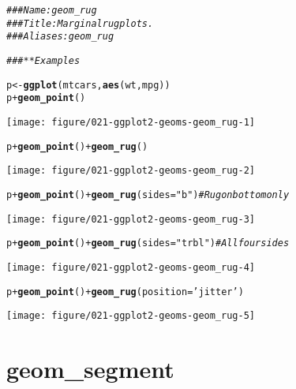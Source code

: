 \documentclass[a4paper,titlepage]{tufte-handout}\usepackage[]{graphicx}\usepackage[]{color}
\makeatletter
\def\maxwidth{ %
  \ifdim\Gin@nat@width>\linewidth
    \linewidth
  \else
    \Gin@nat@width
  \fi
}
\newcommand{\hlstr}[1]{\textcolor[rgb]{0.192,0.494,0.8}{#1}}%
\newcommand{\hlcom}[1]{\textcolor[rgb]{0.678,0.584,0.686}{\textit{#1}}}%
\newcommand{\hlopt}[1]{\textcolor[rgb]{0,0,0}{#1}}%
\newcommand{\hlstd}[1]{\textcolor[rgb]{0.345,0.345,0.345}{#1}}%
\newcommand{\hlkwb}[1]{\textcolor[rgb]{0.69,0.353,0.396}{#1}}%
\newcommand{\hlkwc}[1]{\textcolor[rgb]{0.333,0.667,0.333}{#1}}%
\newcommand{\hlkwd}[1]{\textcolor[rgb]{0.737,0.353,0.396}{\textbf{#1}}}%
\newenvironment{kframe}{%
 \def\at@end@of@kframe{}%
 \ifinner\ifhmode%
  \def\at@end@of@kframe{\end{minipage}}%
  \begin{minipage}{\columnwidth}%
 \fi\fi%
 \def\FrameCommand##1{\hskip\@totalleftmargin \hskip-\fboxsep
 \colorbox{shadecolor}{##1}\hskip-\fboxsep
     \hskip-\linewidth \hskip-\@totalleftmargin \hskip\columnwidth}%
 \MakeFramed {\advance\hsize-\width
   \@totalleftmargin\z@ \linewidth\hsize
   \@setminipage}}%
 {\par\unskip\endMakeFramed%
 \at@end@of@kframe}
\newenvironment{knitrout}{}{} %
\makeatother
\begin{document}
\begin{knitrout}
\color{fgcolor}\begin{kframe}
\begin{alltt}
\hlcom{### Name: geom_rug}
\hlcom{### Title: Marginal rug plots.}
\hlcom{### Aliases: geom_rug}

\hlcom{### ** Examples}

\hlstd{p} \hlkwb{<-} \hlkwd{ggplot}\hlstd{(mtcars,} \hlkwd{aes}\hlstd{(wt, mpg))}
\hlstd{p} \hlopt{+} \hlkwd{geom_point}\hlstd{()}
\end{alltt}
\end{kframe}
\texttt{[image: figure/021-ggplot2-geoms-geom\_rug-1]} 
\begin{kframe}\begin{alltt}
\hlstd{p} \hlopt{+} \hlkwd{geom_point}\hlstd{()} \hlopt{+} \hlkwd{geom_rug}\hlstd{()}
\end{alltt}
\end{kframe}
\texttt{[image: figure/021-ggplot2-geoms-geom\_rug-2]} 
\begin{kframe}\begin{alltt}
\hlstd{p} \hlopt{+} \hlkwd{geom_point}\hlstd{()} \hlopt{+} \hlkwd{geom_rug}\hlstd{(}\hlkwc{sides}\hlstd{=}\hlstr{"b"}\hlstd{)}    \hlcom{# Rug on bottom only}
\end{alltt}
\end{kframe}
\texttt{[image: figure/021-ggplot2-geoms-geom\_rug-3]} 
\begin{kframe}\begin{alltt}
\hlstd{p} \hlopt{+} \hlkwd{geom_point}\hlstd{()} \hlopt{+} \hlkwd{geom_rug}\hlstd{(}\hlkwc{sides}\hlstd{=}\hlstr{"trbl"}\hlstd{)} \hlcom{# All four sides}
\end{alltt}
\end{kframe}
\texttt{[image: figure/021-ggplot2-geoms-geom\_rug-4]} 
\begin{kframe}\begin{alltt}
\hlstd{p} \hlopt{+} \hlkwd{geom_point}\hlstd{()} \hlopt{+} \hlkwd{geom_rug}\hlstd{(}\hlkwc{position}\hlstd{=}\hlstr{'jitter'}\hlstd{)}
\end{alltt}
\end{kframe}
\texttt{[image: figure/021-ggplot2-geoms-geom\_rug-5]} 

\end{knitrout}


\section{geom\_segment}
\end{document}
